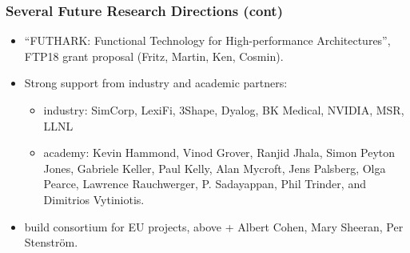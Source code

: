 \documentclass{beamer}
\begin{document}
\begin{frame}[fragile,t]
   \frametitle{Several Future Research Directions (cont)}

\begin{itemize}
    \item ``FUTHARK: Functional Technology for High-performance Architectures'',
    FTP18 grant proposal (Fritz, Martin, Ken, Cosmin).\bigskip

    \item Strong support from industry and academic partners:\smallskip
    \begin{itemize}
        \item industry: SimCorp, LexiFi, 3Shape, Dyalog, BK Medical, NVIDIA, MSR, LLNL\smallskip
        \item academy:  Kevin Hammond, Vinod Grover, Ranjid Jhala, Simon Peyton Jones, 
                Gabriele Keller, Paul Kelly, Alan Mycroft, Jens Palsberg, Olga Pearce, 
                Lawrence Rauchwerger, P. Sadayappan, Phil Trinder, and Dimitrios Vytiniotis.
    \end{itemize}\bigskip

    \item build consortium for EU projects, above + Albert Cohen, Mary Sheeran, Per Stenström.
\end{itemize}

\end{frame}
\end{document}
